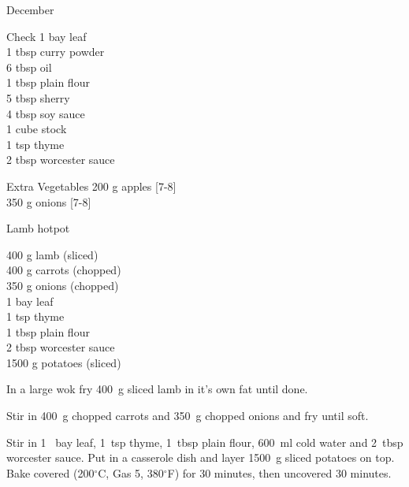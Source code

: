 \begin{menu}{December}
      \par\vfil %
      \vfil\clearpage %
      \begin{shoppinglist}{Check}
      1  bay leaf \\
      1 tbsp curry powder \\
      6 tbsp oil \\
      1 tbsp plain flour \\
      5 tbsp sherry \\
      4 tbsp soy sauce \\
      1 cube stock \\
      1 tsp thyme \\
      2 tbsp worcester sauce \\
      \end{shoppinglist}%
      \begin{shoppinglist}{Extra Vegetables}
      200 g apples {\scriptsize[7-8]}\\
      350 g onions {\scriptsize[7-8]}\\
      \end{shoppinglist}%
      \par\vfil %
    \vfil\clearpage
  
    \begin{recipe}{2}{Lamb hotpot}%
		\begin{ingredients}
		400 g lamb (sliced) \\
	400 g carrots (chopped) \\
	350 g onions (chopped) \\
	1  bay leaf  \\
	1 tsp thyme  \\
	1 tbsp plain flour  \\
	2 tbsp worcester sauce  \\
	1500 g potatoes (sliced) \\
	
		\end{ingredients}
	
    \begin{instructions}
    \item 
        In a large wok fry
        400~g sliced lamb
        in it's own fat until done.
      \item 
        Stir in
        400~g chopped carrots
        and
        350~g chopped onions
        and fry until soft.
      \item 
        Stir in
        1~  bay leaf,
        1~tsp  thyme,
        1~tbsp  plain flour,
        600~ml  cold water
        and
        2~tbsp  worcester sauce.
        Put in a casserole dish and
        layer 1500~g sliced potatoes on top.
        Bake covered (200$^{\circ}$C, Gas 5, 380$^{\circ}$F)
        for 30 minutes,
        then uncovered 30 minutes.
      

\end{instructions}
\end{recipe}
\end{menu}
